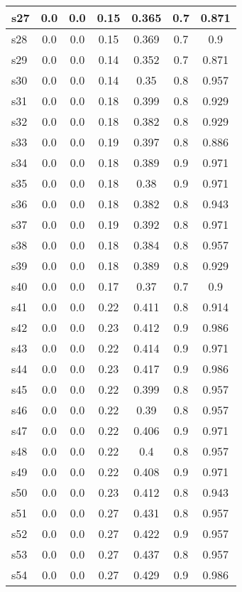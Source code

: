 \documentclass{article}
\begin{document}
\begin{tabular}{|l|c|c|c|c|c|c|}
\hline
s27 &0.0 & 0.0 & 0.15 & 0.365 & 0.7 & 0.871\\
\hline
s28 &0.0 & 0.0 & 0.15 & 0.369 & 0.7 & 0.9\\
\hline
s29 &0.0 & 0.0 & 0.14 & 0.352 & 0.7 & 0.871\\
\hline
s30 &0.0 & 0.0 & 0.14 & 0.35 & 0.8 & 0.957\\
\hline
s31 &0.0 & 0.0 & 0.18 & 0.399 & 0.8 & 0.929\\
\hline
s32 &0.0 & 0.0 & 0.18 & 0.382 & 0.8 & 0.929\\
\hline
s33 &0.0 & 0.0 & 0.19 & 0.397 & 0.8 & 0.886\\
\hline
s34 &0.0 & 0.0 & 0.18 & 0.389 & 0.9 & 0.971\\
\hline
s35 &0.0 & 0.0 & 0.18 & 0.38 & 0.9 & 0.971\\
\hline
s36 &0.0 & 0.0 & 0.18 & 0.382 & 0.8 & 0.943\\
\hline
s37 &0.0 & 0.0 & 0.19 & 0.392 & 0.8 & 0.971\\
\hline
s38 &0.0 & 0.0 & 0.18 & 0.384 & 0.8 & 0.957\\
\hline
s39 &0.0 & 0.0 & 0.18 & 0.389 & 0.8 & 0.929\\
\hline
s40 &0.0 & 0.0 & 0.17 & 0.37 & 0.7 & 0.9\\
\hline
s41 &0.0 & 0.0 & 0.22 & 0.411 & 0.8 & 0.914\\
\hline
s42 &0.0 & 0.0 & 0.23 & 0.412 & 0.9 & 0.986\\
\hline
s43 &0.0 & 0.0 & 0.22 & 0.414 & 0.9 & 0.971\\
\hline
s44 &0.0 & 0.0 & 0.23 & 0.417 & 0.9 & 0.986\\
\hline
s45 &0.0 & 0.0 & 0.22 & 0.399 & 0.8 & 0.957\\
\hline
s46 &0.0 & 0.0 & 0.22 & 0.39 & 0.8 & 0.957\\
\hline
s47 &0.0 & 0.0 & 0.22 & 0.406 & 0.9 & 0.971\\
\hline
s48 &0.0 & 0.0 & 0.22 & 0.4 & 0.8 & 0.957\\
\hline
s49 &0.0 & 0.0 & 0.22 & 0.408 & 0.9 & 0.971\\
\hline
s50 &0.0 & 0.0 & 0.23 & 0.412 & 0.8 & 0.943\\
\hline
s51 &0.0 & 0.0 & 0.27 & 0.431 & 0.8 & 0.957\\
\hline
s52 &0.0 & 0.0 & 0.27 & 0.422 & 0.9 & 0.957\\
\hline
s53 &0.0 & 0.0 & 0.27 & 0.437 & 0.8 & 0.957\\
\hline
s54 &0.0 & 0.0 & 0.27 & 0.429 & 0.9 & 0.986\\
\hline

\end{tabular}
\end{document}
